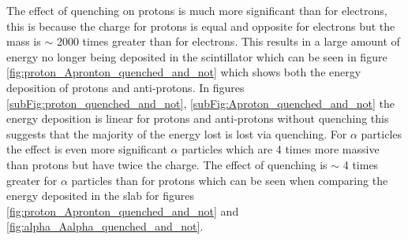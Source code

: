 The effect of quenching on protons is much more significant than for electrons, this is because the charge for protons is equal and opposite for electrons but the mass is $\sim$ 2000 times greater than for electrons. This results in a large amount of energy no longer being deposited in the scintillator which can be seen in figure \ref{fig:proton_Apronton_quenched_and_not} which shows both the energy deposition of protons and anti-protons. In figures \ref{subFig:proton_quenched_and_not}, \ref{subFig:Aproton_quenched_and_not} the energy deposition is linear for protons and anti-protons without quenching this suggests that the majority of the energy lost is lost via quenching. For $\alpha$ particles the effect is even more significant $\alpha$ particles which are 4 times more massive than protons but have twice the charge. The effect of quenching is $\sim$ 4 times greater for $\alpha$ particles than for protons which can be seen when comparing the energy deposited in the slab for figures \ref{fig:proton_Apronton_quenched_and_not} and \ref{fig:alpha_Aalpha_quenched_and_not}. 

